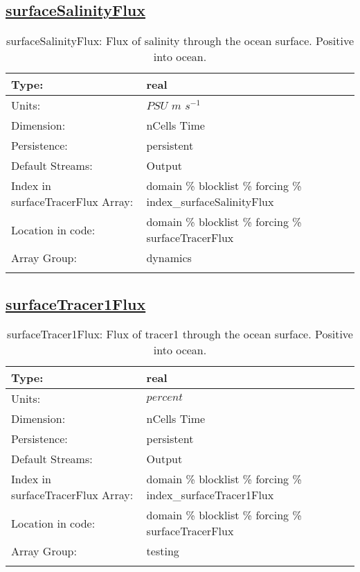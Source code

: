 \subsection[surfaceSalinityFlux]{\hyperref[sec:var_tab_forcing]{surfaceSalinityFlux}}
\label{subsec:var_sec_forcing_surfaceSalinityFlux}
\begin{center}
\begin{longtable}{| p{2.0in} | p{4.0in} |}
        \hline 
        Type: & real \\
        \hline 
        Units: & $PSU$ $m$ $s^{-1}$ \\
        \hline 
        Dimension: & nCells Time \\
        \hline 
        Persistence: & persistent \\
        \hline 
		 Default Streams: & Output  \\
        \hline 
		 Index in surfaceTracerFlux Array: & domain \% blocklist \% forcing \% index\_surfaceSalinityFlux \\
		 \hline 
		 Location in code: & domain \% blocklist \% forcing \% surfaceTracerFlux \\
		 \hline 
		 Array Group: & dynamics \\
		 \hline 
    \caption{surfaceSalinityFlux: Flux of salinity through the ocean surface. Positive into ocean.}
\end{longtable}
\end{center}
\subsection[surfaceTracer1Flux]{\hyperref[sec:var_tab_forcing]{surfaceTracer1Flux}}
\label{subsec:var_sec_forcing_surfaceTracer1Flux}
\begin{center}
\begin{longtable}{| p{2.0in} | p{4.0in} |}
        \hline 
        Type: & real \\
        \hline 
        Units: & $percent$ \\
        \hline 
        Dimension: & nCells Time \\
        \hline 
        Persistence: & persistent \\
        \hline 
		 Default Streams: & Output  \\
        \hline 
		 Index in surfaceTracerFlux Array: & domain \% blocklist \% forcing \% index\_surfaceTracer1Flux \\
		 \hline 
		 Location in code: & domain \% blocklist \% forcing \% surfaceTracerFlux \\
		 \hline 
		 Array Group: & testing \\
		 \hline 
    \caption{surfaceTracer1Flux: Flux of tracer1 through the ocean surface. Positive into ocean.}
\end{longtable}
\end{center}
